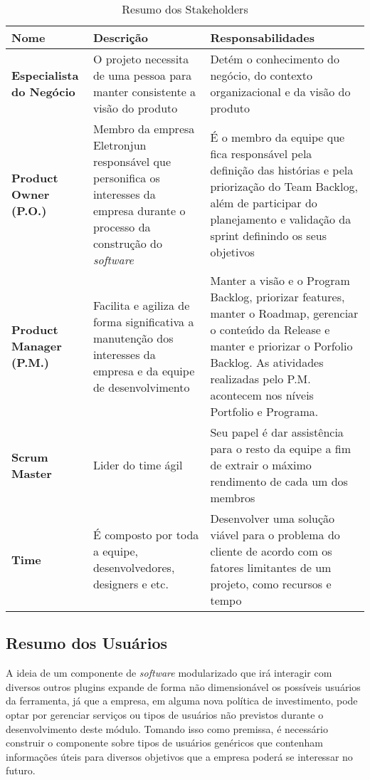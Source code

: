       \begin{table}[!htbp]
        \centering
        \caption{Resumo dos Stakeholders}
        \label{Resumo dos Stakeholders}
        \begin{tabularx}{0.9\textwidth}{|s|s|t|}
          \hline
            \textbf{Nome}             &     \textbf{Descrição}     &   \textbf{Responsabilidades} \\ \hline
           \textbf{Especialista do Negócio}   & O projeto necessita de uma pessoa para manter consistente a visão do produto & Detém o conhecimento do negócio, do contexto organizacional e da visão do produto  \\ \hline
           \textbf{Product Owner (P.O.)}      & Membro da empresa Eletronjun responsável que personifica os interesses da empresa durante o processo da construção do \textit{software} & É o membro da equipe que fica responsável pela definição das histórias e pela priorização do Team Backlog, além de participar do planejamento e validação da sprint definindo os seus objetivos   \\ \hline
           \textbf{Product Manager (P.M.)}    & Facilita e agiliza de forma significativa a manutenção dos interesses da empresa e da equipe de desenvolvimento & Manter a visão e o Program Backlog, priorizar features, manter o Roadmap, gerenciar o conteúdo da Release e manter e priorizar o Porfolio Backlog. As atividades realizadas pelo P.M. acontecem nos níveis Portfolio e Programa. \\ \hline
           \textbf{Scrum Master}              & Lider do time ágil & Seu papel é dar assistência para o resto da equipe a fim de extrair o máximo rendimento de cada um dos membros  \\ \hline
           \textbf{Time}                      & É composto por toda a equipe, desenvolvedores, designers e etc. & Desenvolver uma solução viável para o problema do cliente de acordo com os fatores limitantes de um projeto, como recursos e tempo   \\ \hline
        \end{tabularx}
      \end{table}

    \subsection{Resumo dos Usuários} \label{res_usuarios}
A ideia de um componente de \textit{software} modularizado que irá interagir com diversos outros plugins expande de forma não dimensionável os possíveis usuários da ferramenta, já que a empresa, em alguma nova política de investimento, pode optar por gerenciar serviços ou tipos de usuários não previstos durante o desenvolvimento deste módulo. Tomando isso como premissa, é necessário construir o componente sobre tipos de usuários genéricos que contenham informações úteis para diversos objetivos que a empresa poderá se interessar no futuro.

